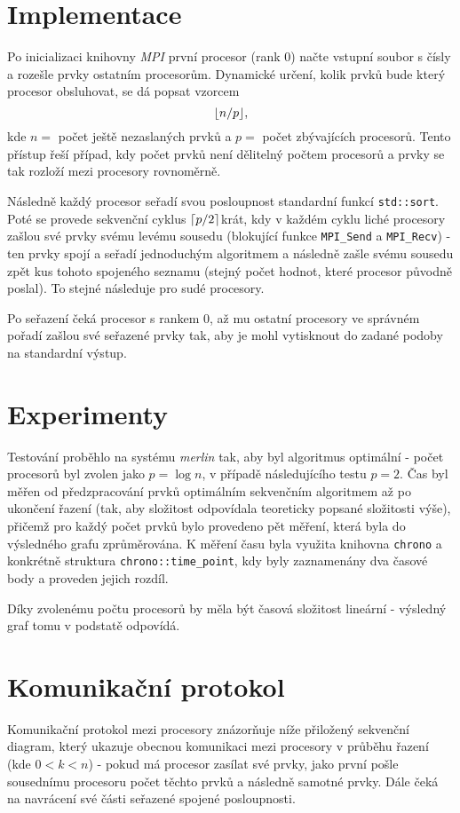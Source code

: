 \documentclass[12pt]{article}
\DeclarePairedDelimiter{\ceil}{\lceil}{\rceil}
\DeclarePairedDelimiter\floor{\lfloor}{\rfloor}
\begin{document}
\newpage
\section{Implementace}
Po inicializaci knihovny \textit{MPI} první procesor (rank 0) načte vstupní soubor s čísly a rozešle prvky ostatním procesorům. Dynamické určení, kolik prvků bude který procesor obsluhovat, se dá popsat vzorcem
$$ \floor*{n/p}, $$
kde $n =$ počet ještě nezaslaných prvků a $p =$ počet zbývajících procesorů. Tento přístup řeší případ, kdy počet prvků není dělitelný počtem procesorů a prvky se tak rozloží mezi procesory rovnoměrně.

Následně každý procesor seřadí svou posloupnost standardní funkcí \verb|std::sort|. Poté se provede sekvenční cyklus $\ceil*{p/2}$krát, kdy v každém cyklu liché procesory zašlou své prvky svému levému sousedu (blokující funkce \verb|MPI_Send| a \verb|MPI_Recv|) - ten prvky spojí a seřadí jednoduchým algoritmem a následně zašle svému sousedu zpět kus tohoto spojeného seznamu (stejný počet hodnot, které procesor původně poslal). To stejné následuje pro sudé procesory.

Po seřazení čeká procesor s rankem 0, až mu ostatní procesory ve správném pořadí zašlou své seřazené prvky tak, aby je mohl vytisknout do zadané podoby na standardní výstup.

\section{Experimenty}

Testování proběhlo na systému \textit{merlin} tak, aby byl algoritmus optimální - počet procesorů byl zvolen jako $p = \log n$, v případě následujícího testu $p = 2$. Čas byl měřen od předzpracování prvků optimálním sekvenčním algoritmem až po ukončení řazení (tak, aby složitost odpovídala teoreticky popsané složitosti výše), přičemž pro každý počet prvků bylo provedeno pět měření, která byla do výsledného grafu zprůměrována. K měření času byla využita knihovna \verb|chrono| a konkrétně struktura \verb|chrono::time_point|, kdy byly zaznamenány dva časové body a proveden jejich rozdíl.

Díky zvolenému počtu procesorů by měla být časová složitost lineární - výsledný graf tomu v podstatě odpovídá.

\newpage
\section{Komunikační protokol}
Komunikační protokol mezi procesory znázorňuje níže přiložený sekvenční diagram, který ukazuje obecnou komunikaci mezi procesory v průběhu řazení (kde $ 0 < k < n$) - pokud má procesor zasílat své prvky, jako první pošle sousednímu procesoru počet těchto prvků a následně samotné prvky. Dále čeká na navrácení své části seřazené spojené posloupnosti.
\end{document}

